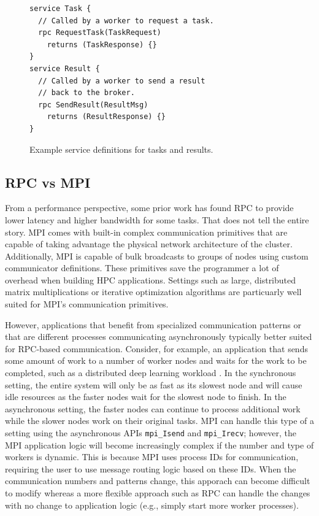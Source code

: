 \documentclass[conference]{IEEEtran}
\begin{document}
\begin{figure}
  \begin{lstlisting}
service Task {
  // Called by a worker to request a task.
  rpc RequestTask(TaskRequest)
    returns (TaskResponse) {}
}
service Result {
  // Called by a worker to send a result
  // back to the broker.
  rpc SendResult(ResultMsg)
    returns (ResultResponse) {}
}
  \end{lstlisting}
  \caption{Example service definitions for tasks and results.}
  \label{fig:task-result-services}
\end{figure}

\subsection{RPC vs MPI}
From a performance perspective, some prior work \cite{rpc-perf} has found RPC to
provide lower latency and higher bandwidth for some tasks. That does not tell
the entire story. MPI comes with built-in complex communication primitives that
are capable of taking advantage the physical network architecture of the
cluster. Additionally, MPI is capable of bulk broadcasts to groups of nodes
using custom communicator definitions. These primitives save the programmer a
lot of overhead when building HPC applications. Settings such as large,
distributed matrix multiplications or iterative optimization algorithms are
particuarly well suited for MPI's communication primitives.

However, applications that benefit from specialized communication patterns or
that are different processes communicating asynchronously typically better
suited for RPC-based communication. Consider, for example, an application that
sends some amount of work to a number of worker nodes and waits for the work
to be completed, such as a distributed deep learning workload \cite{40565}. In the
synchronous setting, the entire system will only be as fast as its slowest node
and will cause idle resources as the faster nodes wait for the slowest node to
finish. In the asynchronous setting, the faster nodes can continue to process
additional work while the slower nodes work on their original tasks. MPI can
handle this type of a setting using the asynchronous APIs \texttt{mpi\_Isend}
and \texttt{mpi\_Irecv}; however, the MPI application logic will become increasingly
complex if the number and type of workers is dynamic. This is because MPI uses
process IDs for communication, requiring the user to use message routing logic
based on these IDs. When the communication numbers and patterns change, this
apporach can become difficult to modify whereas a more flexible approach such
as RPC can handle the changes with no change to application logic (e.g., simply
start more worker processes).
\end{document}
